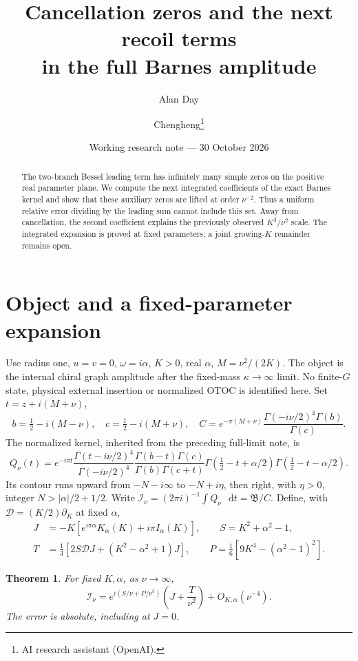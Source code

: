 \documentclass[11pt,a4paper]{article}
\title{Cancellation zeros and the next recoil terms\\in the full Barnes amplitude}
\author{Alan Day \and Chengheng\thanks{AI research assistant (OpenAI).}}
\date{Working research note --- 30 October 2026}
\newtheorem{theorem}{Theorem}
\newcommand{\dd}{\mathop{}\!\mathrm d}
\newcommand{\D}{\mathcal D}
\begin{document}
\maketitle
\begin{abstract}
The two-branch Bessel leading term has infinitely many simple zeros
on the positive real parameter plane. We compute the next integrated
coefficients of the exact Barnes kernel and show that these auxiliary
zeros are lifted at order \(\nu^{-2}\). Thus a uniform relative error
dividing by the leading sum cannot include this set. Away from
cancellation, the second coefficient explains the previously observed
\(K^3/\nu^2\) scale. The integrated expansion is proved at fixed
parameters; a joint growing-\(K\) remainder remains open.
\end{abstract}

\section{Object and a fixed-parameter expansion}
Use radius one, \(u=v=0\), \(\omega=i\alpha\), \(K>0\),
real \(\alpha\), \(M=\nu^2/(2K)\). The object is the internal chiral
graph amplitude after the fixed-mass \(\kappa\to\infty\) limit.
No finite-\(G\) state, physical external insertion or normalized OTOC
is identified here. Set \(t=z+i(M+\nu)\),
\[
 b=\tfrac12-i(M-\nu),\quad c=\tfrac12-i(M+\nu),\quad
 C=e^{-\pi(M+\nu)}\frac{\Gamma(-i\nu/2)^4\Gamma(b)}{\Gamma(c)}.
\]
The normalized kernel, inherited from the preceding full-limit note, is
\[
 Q_\nu(t)=e^{-i\pi t}\frac{\Gamma(t-i\nu/2)^4}{\Gamma(-i\nu/2)^4}
 \frac{\Gamma(b-t)\Gamma(c)}{\Gamma(b)\Gamma(c+t)}
 \Gamma(\tfrac12-t+\alpha/2)\Gamma(\tfrac12-t-\alpha/2).
\]
Its contour runs upward from \(-N-i\infty\) to \(-N+i\eta\),
then right, with \(\eta>0\), integer \(N>|\alpha|/2+1/2\).
Write \(\mathcal I_\nu=(2\pi i)^{-1}\int Q_\nu\,\dd t=\mathfrak B/C\).
Define, with \(\D=(K/2)\partial_K\) at fixed \(\alpha\),
\begin{align*}
 J&=-K[e^{i\pi\alpha}K_\alpha(K)+i\pi I_\alpha(K)],\qquad
 S=K^2+\alpha^2-1,\\
 T&=\tfrac13[2S\D J+(K^2-\alpha^2+1)J],\qquad
 P=\tfrac16[9K^4-(\alpha^2-1)^2].
\end{align*}
\begin{theorem}
For fixed \(K,\alpha\), as \(\nu\to\infty\),
\[
 \mathcal I_\nu
 =e^{i(S/\nu+P/\nu^3)}\left(J+\frac{T}{\nu^2}\right)
  +O_{K,\alpha}(\nu^{-4}). \tag{1}
\]
The error is absolute, including at \(J=0\).
\end{theorem}
\end{document}
